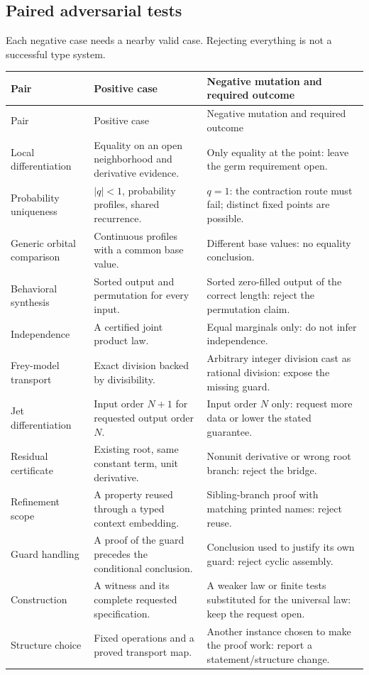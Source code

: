 \documentclass[11pt,a4paper]{article}
\theoremstyle{definition}
\begin{document}
\subsection{Paired adversarial tests}
Each negative case needs a nearby valid case. Rejecting everything is not a
successful type system.
\begin{center}\small
\begin{longtable}{@{}P{42mm}P{53mm}P{53mm}@{}}
\toprule
Pair & Positive case & Negative mutation and required outcome\\
\midrule\endfirsthead
\toprule Pair & Positive case & Negative mutation and required outcome\\\midrule\endhead
\bottomrule\endfoot
Local differentiation & Equality on an open neighborhood and derivative evidence. & Only equality at the point: leave the germ requirement open.\\
Probability uniqueness & $|q|<1$, probability profiles, shared recurrence. & $q=1$: the contraction route must fail; distinct fixed points are possible.\\
Generic orbital comparison & Continuous profiles with a common base value. & Different base values: no equality conclusion.\\
Behavioral synthesis & Sorted output and permutation for every input. & Sorted zero-filled output of the correct length: reject the permutation claim.\\
Independence & A certified joint product law. & Equal marginals only: do not infer independence.\\
Frey-model transport & Exact division backed by divisibility. & Arbitrary integer division cast as rational division: expose the missing guard.\\
Jet differentiation & Input order $N+1$ for requested output order $N$. & Input order $N$ only: request more data or lower the stated guarantee.\\
Residual certificate & Existing root, same constant term, unit derivative. & Nonunit derivative or wrong root branch: reject the bridge.\\
Refinement scope & A property reused through a typed context embedding. & Sibling-branch proof with matching printed names: reject reuse.\\
Guard handling & A proof of the guard precedes the conditional conclusion. & Conclusion used to justify its own guard: reject cyclic assembly.\\
Construction & A witness and its complete requested specification. & A weaker law or finite tests substituted for the universal law: keep the request open.\\
Structure choice & Fixed operations and a proved transport map. & Another instance chosen to make the proof work: report a statement/structure change.\\
\end{longtable}
\end{center}
\end{document}
